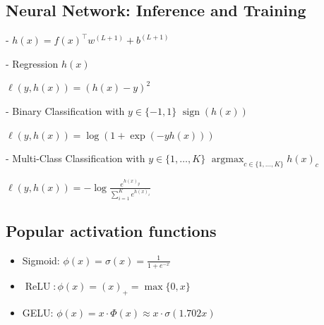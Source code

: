 \subsection*{Neural Network: Inference and Training}
- $h(x)=f(x)^\top w^{(L+1)}+b^{(L+1)}$

- Regression $h(x)$

$
\ell(y, h(x))=(h(x)-y)^{2}
$

- Binary Classification with $y \in\{-1,1\}$ $ \operatorname{sign}(h(x))$

$
\ell(y, h(x))=\log (1+\exp (-y h(x)))
$

- Multi-Class Classification with $y \in\{1, \ldots, K\}$
$
\operatorname{argmax}_{c \in\{1, \ldots, K\}} h(x)_{c}
$

$
\ell(y, h(x))=-\log \frac{e^{h(x)_{y}}}{\sum_{i=1}^{K} e^{h(x)_{i}}}
$

\subsection*{Popular activation functions}
\begin{itemize}
  \item Sigmoid: $\phi(x)=\sigma(x)=\frac{1}{1+e^{-x}}$

  \item $\operatorname{ReLU}: \phi(x)=(x)_{+}=\max \{0, x\}$

  \item GELU: $\phi(x)=x \cdot \Phi(x) \approx x \cdot \sigma(1.702 x)$

\end{itemize}





